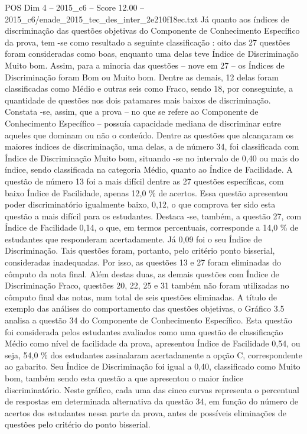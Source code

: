 \begin{textsample}{POS Dim 4 – 2015\_c6 – Score 12.00 – 2015\_c6/enade\_2015\_tec\_des\_inter\_2e210f18ec.txt}
Já quanto aos índices de discriminação das questões objetivas do Componente de Conhecimento Específico da prova, tem -se como resultado a seguinte classificação : oito das 27 questões foram consideradas como boas, enquanto uma delas teve Índice de Discriminação Muito bom.
Assim, para a minoria das questões – nove em 27 – os Índices de Discriminação foram Bom ou Muito bom.
Dentre as demais, 12 delas foram classificadas como Médio e outras seis como Fraco, sendo 18, por conseguinte, a quantidade de questões nos dois patamares mais baixos de discriminação.
Constata -se, assim, que a prova – no que se refere ao Componente de Conhecimento Específico – possuía capacidade mediana de discriminar entre aqueles que dominam ou não o conteúdo.
Dentre as questões que alcançaram os maiores índices de discriminação, uma delas, a de número 34, foi classificada com Índice de Discriminação Muito bom, situando -se no intervalo de 0,40 ou mais do índice, sendo classificada na categoria Médio, quanto ao Índice de Facilidade.
A questão de número 13 foi a mais difícil dentre as 27 questões específicas, com baixo Índice de Facilidade, apenas 12,0 \% de acertos.
Essa questão apresentou poder discriminatório igualmente baixo, 0,12, o que comprova ter sido esta questão a mais difícil para os estudantes.
Destaca -se, também, a questão 27, com Índice de Facilidade 0,14, o que, em termos percentuais, corresponde a 14,0 \% de estudantes que responderam acertadamente.
Já 0,09 foi o seu Índice de Discriminação.
Tais questões foram, portanto, pelo critério ponto bisserial, consideradas inadequadas.
Por isso, as questões 13 e 27 foram eliminadas do cômputo da nota final.
Além destas duas, as demais questões com Índice de Discriminação Fraco, questões 20, 22, 25 e 31 também não foram utilizadas no cômputo final das notas, num total de seis questões eliminadas.
A título de exemplo das análises do comportamento das questões objetivas, o Gráfico 3.5 analisa a questão 34 do Componente de Conhecimento Específico.
Esta questão foi considerada pelos estudantes avaliados como uma questão de classificação Médio como nível de facilidade da prova, apresentou Índice de Facilidade 0,54, ou seja, 54,0 \% dos estudantes assinalaram acertadamente a opção C, correspondente ao gabarito.
Seu Índice de Discriminação foi igual a 0,40, classificado como Muito bom, também sendo esta questão a que apresentou o maior índice discriminatório.
Neste gráfico, cada uma das cinco curvas representa o percentual de respostas em determinada alternativa da questão 34, em função do número de acertos dos estudantes nessa parte da prova, antes de possíveis eliminações de questões pelo critério do ponto bisserial.

\end{textsample}
